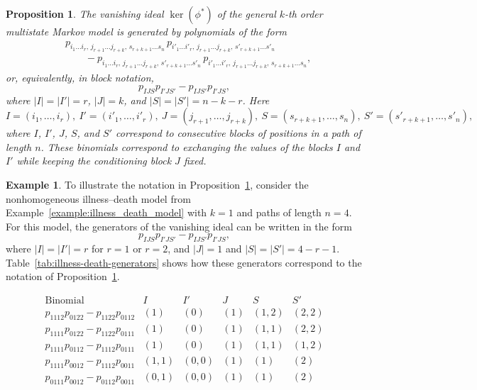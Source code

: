 \documentclass[11pt, a4paper]{article}
\numberwithin{equation}{section}
\theoremstyle{plain}
\newtheorem{proposition}[theorem]{Proposition}
\theoremstyle{definition}
\newtheorem{example}{Example}
\begin{document}
\begin{proposition}
\label{prop:generating set general}
The vanishing ideal $\ker(\phi^*)$ of the general $k$-th order multistate Markov model is generated by polynomials of the form
\begin{align*}
&p_{i_1\ldots i_r,\, j_{r+1}\ldots j_{r+k},\, s_{r+k+1}\ldots s_n}\,
 p_{i'_1\ldots i'_r,\, j_{r+1}\ldots j_{r+k},\, s'_{r+k+1}\ldots s'_n} \\
&\qquad -
p_{i_1\ldots i_r,\, j_{r+1}\ldots j_{r+k},\, s'_{r+k+1}\ldots s'_n}\,
 p_{i'_1\ldots i'_r,\, j_{r+1}\ldots j_{r+k},\, s_{r+k+1}\ldots s_n},
\end{align*}
or, equivalently, in block notation,
\[
p_{IJS}p_{I'JS'} - p_{IJS'}p_{I'JS},
\]
where $|I|=|I'|=r$, $|J|=k$, and $|S|=|S'|=n-k-r$. Here
\[
I=(i_1,\ldots,i_r), \
I'=(i'_1,\ldots,i'_r), \
J=(j_{r+1},\ldots,j_{r+k}), \
S=(s_{r+k+1},\ldots,s_n), \
S'=(s'_{r+k+1},\ldots,s'_n),
\]
where $I$, $I'$, $J$, $S$, and $S'$ correspond to consecutive blocks of positions in a path of length $n$.
These binomials correspond to exchanging the values of the blocks $I$ and $I'$ while keeping the
conditioning block $J$ fixed.
\end{proposition}

\begin{example}
To illustrate the notation in Proposition~\ref{prop:generating set general}, consider the nonhomogeneous illness--death model from Example~\ref{example:illness_death_model} with $k=1$ and paths of length $n=4$. For this model, the generators of the vanishing ideal can be written in the form
\[
p_{IJS}p_{I'JS'}-p_{IJS'}p_{I'JS},
\]
where $|I|=|I'|=r$ for $r=1$ or $r=2$, and $|J|=1$ and $|S|=|S'|=4-r-1$. Table~\ref{tab:illness-death-generators} shows how these generators correspond to the notation of Proposition~\ref{prop:generating set general}.
\begin{table}[h]
\centering
\caption{Generators of the nonhomogeneous ideal in Example~\ref{example:illness_death_model} in the notation of Proposition~\ref{prop:generating set general}. The generators of the vanishing ideal can be written in the form
$p_{IJS}p_{I'JS'}-p_{IJS'}p_{I'JS},$
where $|I|=|I'|=r$ for $r=1$ or $r=2$, and $|J|=1$ and $|S|=|S'|=4-r-1$. }
\label{tab:illness-death-generators}
\[
\begin{array}{c|c|c|c|c|c}
\text{Binomial} & I & I' & J & S & S' \\
\hline
p_{1112}p_{0122}-p_{1122}p_{0112}
& (1) & (0) & (1) & (1,2) & (2,2) \\[1mm]
p_{1111}p_{0122}-p_{1122}p_{0111}
& (1) & (0) & (1) & (1,1) & (2,2) \\[1mm]
p_{1111}p_{0112}-p_{1112}p_{0111}
& (1) & (0) & (1) & (1,1) & (1,2)  \\[1mm]
p_{1111}p_{0012}-p_{1112}p_{0011}
& (1,1) & (0,0) & (1) & (1) & (2) \\[1mm]
p_{0111}p_{0012}-p_{0112}p_{0011}
& (0,1) & (0,0) & (1) & (1) & (2) 
\end{array}
\]
\end{table} 
\end{example}
\end{document}
